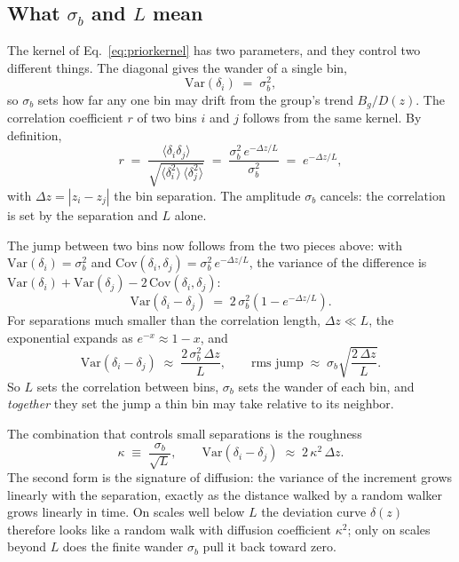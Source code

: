 \documentclass[11pt]{article}
\begin{document}
\subsection{What $\sigma_b$ and $L$ mean}
\label{sec:jump}

The kernel of Eq.~\eqref{eq:priorkernel} has two parameters, and they
control two different things.  The diagonal gives the wander of a single
bin,
\begin{equation}
  \mathrm{Var}(\delta_i) \;=\; \sigma_b^2 ,
  \label{eq:wander}
\end{equation}
so $\sigma_b$ sets how far any one bin may drift from the group's
trend $B_g/D(z)$.  The correlation coefficient $r$ of two bins $i$ and $j$ follows from
the same kernel.  By definition,
\begin{equation}
  r \;=\;
  \frac{\langle \delta_i \delta_j \rangle}
       {\sqrt{\langle \delta_i^2 \rangle\,\langle \delta_j^2 \rangle}}
  \;=\;
  \frac{\sigma_b^2\, e^{-\Delta z / L}}{\sigma_b^2}
  \;=\; e^{-\Delta z / L},
  \label{eq:rdef}
\end{equation}
with $\Delta z = |z_i - z_j|$ the bin separation.  The amplitude
$\sigma_b$ cancels: the correlation is set by the separation and $L$
alone.

The jump between two bins now follows from the two pieces above:
with $\mathrm{Var}(\delta_i) = \sigma_b^2$ and
$\mathrm{Cov}(\delta_i, \delta_j) = \sigma_b^2\, e^{-\Delta z / L}$,
the variance of the difference is
$\mathrm{Var}(\delta_i) + \mathrm{Var}(\delta_j)
- 2\,\mathrm{Cov}(\delta_i, \delta_j)$:
\begin{equation}
  \mathrm{Var}(\delta_i - \delta_j)
  \;=\;
  2\,\sigma_b^2\left(1 - e^{-\Delta z / L}\right).
  \label{eq:jumpvar}
\end{equation}
For separations much smaller than the correlation length,
$\Delta z \ll L$, the exponential expands as
$e^{-x} \approx 1 - x$, and
\begin{equation}
  \mathrm{Var}(\delta_i - \delta_j)
  \;\approx\;
  \frac{2\,\sigma_b^2\,\Delta z}{L},
  \qquad
  \text{rms jump}
  \;\approx\;
  \sigma_b \sqrt{\frac{2\,\Delta z}{L}} .
  \label{eq:jumptaylor}
\end{equation}
So $L$ sets the correlation between bins, $\sigma_b$ sets the wander of
each bin, and \emph{together} they set the jump a thin bin may take
relative to its neighbor.

The combination that controls small separations is the roughness
\begin{equation}
  \kappa \;\equiv\; \frac{\sigma_b}{\sqrt{L}},
  \qquad
  \mathrm{Var}(\delta_i - \delta_j) \;\approx\; 2\,\kappa^2\,\Delta z .
  \label{eq:roughness}
\end{equation}
The second form is the signature of diffusion: the variance of the
increment grows linearly with the separation, exactly as the distance
walked by a random walker grows linearly in time.  On scales well below
$L$ the deviation curve $\delta(z)$ therefore looks like a random walk
with diffusion coefficient $\kappa^2$; only on scales beyond $L$ does
the finite wander $\sigma_b$ pull it back toward zero.
\end{document}
